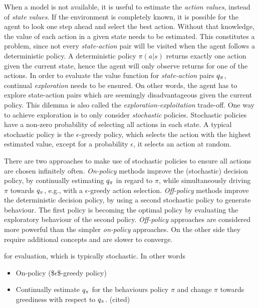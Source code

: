 \documentclass[a4paper, twoside, 12pt]{article}
\begin{document}
When a model is not available, it is useful to estimate the \emph{action values},
instead of \emph{state values}. If the environment is completely known, it is
possible for the agent to look one step ahead and select the best action.
Without that knowledge, the value of each action in a given state needs to be
estimated. This constitutes a problem, since not every \emph{state-action} pair will
be visited when the agent follows a deterministic policy. A deterministic policy
\(\pi(a|s)\) returns exactly one action given the current state, hence the agent
will only observe returns for one of the actions. In order to evaluate the
value function for \emph{state-action} pairs \(q_\pi\), continual \emph{exploration} needs to
be ensured. On other words, the agent has to explore state-action pairs which
are seemingly disadvantageous given the current policy. This dilemma is also
called the \emph{exploration-exploitation} trade-off. One way to achieve exploration
is to only consider \emph{stochastic} policies. Stochastic policies have a non-zero
probability of selecting all actions in each state. A typical stochastic policy
is the \(\epsilon\)-greedy policy, which selects the action with the highest
estimated value, except for a probability \(\epsilon\), it selects an action at
random.

There are two approaches to make use of stochastic policies to ensure all
actions are chosen infinitely often. \emph{On-policy} methods improve the
(stochastic) decision policy, by continually estimating \(q_\pi\) in regard to
\(\pi\), while simultaneously driving \(\pi\) towards \(q_\pi\), e.g., with a
\(\epsilon\)-greedy action selection. \emph{Off-policy} methods improve the deterministic
decision policy, by using a second stochastic policy to generate behaviour. The
first policy is becoming the optimal policy by evaluating the exploratory
behaviour of the second policy. \emph{Off-policy} approaches are considered more
powerful than the simpler \emph{on-policy} approaches. On the other side they require
additional concepts and are slower to converge.

for evaluation, which is typically
stochastic. In other words

\begin{itemize}
\item On-policy (\$\(\epsilon\)\$-greedy policy)
\item Continually estimate \(q_\pi\) for the behaviours policy \(\pi\) and change \(\pi\)
towards greediness with respect to \(q_\pi\). (cited)
\end{itemize}
\end{document}
